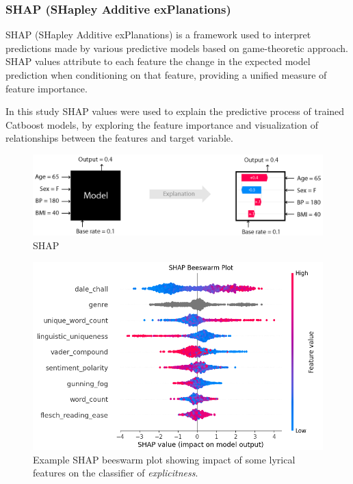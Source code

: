 \subsubsection*{SHAP (SHapley Additive exPlanations)}

SHAP (SHapley Additive exPlanations) is a framework used to interpret
predictions made by various predictive models based on game-theoretic approach.
SHAP values attribute to each feature the change in the expected model
prediction when conditioning on that feature, providing a unified measure
of feature importance.\cite{shap}

In this study SHAP values were used to explain the predictive process
of trained Catboost models, by exploring the feature importance and
visualization of relationships between the features and target variable.

\begin{center}
  \begin{figure}[H]
  \centering
  \includegraphics[width=5in]{img/shap_intro.png}
  \caption{SHAP}
  \label{Figure:fig_beh}
\end{figure}
\end{center}

\begin{center}
  \begin{figure}[H]
  \centering
  \includegraphics[width=4.5in]{img/shap_beeswarm.png}
  \caption{Example SHAP beeswarm plot showing impact of some lyrical features
  on the classifier of \textit{explicitness}.}
  \label{Figure:fig_beh}
\end{figure}
\end{center}

